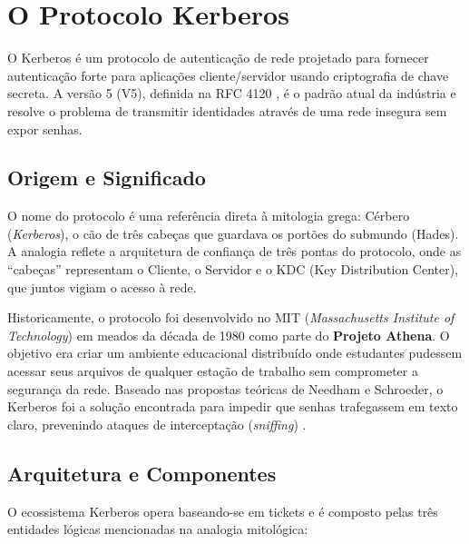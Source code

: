 \section{O Protocolo Kerberos}

O Kerberos é um protocolo de autenticação de rede projetado para fornecer autenticação forte para aplicações cliente/servidor usando criptografia de chave secreta. A versão 5 (V5), definida na RFC 4120 \cite{rfc4120}, é o padrão atual da indústria e resolve o problema de transmitir identidades através de uma rede insegura sem expor senhas.

\subsection{Origem e Significado}
O nome do protocolo é uma referência direta à mitologia grega: Cérbero (\textit{Kerberos}), o cão de três cabeças que guardava os portões do submundo (Hades). A analogia reflete a arquitetura de confiança de três pontas do protocolo, onde as ``cabeças'' representam o Cliente, o Servidor e o KDC (Key Distribution Center), que juntos vigiam o acesso à rede.

Historicamente, o protocolo foi desenvolvido no MIT (\textit{Massachusetts Institute of Technology}) em meados da década de 1980 como parte do \textbf{Projeto Athena}. O objetivo era criar um ambiente educacional distribuído onde estudantes pudessem acessar seus arquivos de qualquer estação de trabalho sem comprometer a segurança da rede. Baseado nas propostas teóricas de Needham e Schroeder, o Kerberos foi a solução encontrada para impedir que senhas trafegassem em texto claro, prevenindo ataques de interceptação (\textit{sniffing}) \cite{neuman1994}.

\subsection{Arquitetura e Componentes}
O ecossistema Kerberos opera baseando-se em tickets e é composto pelas três entidades lógicas mencionadas na analogia mitológica:

